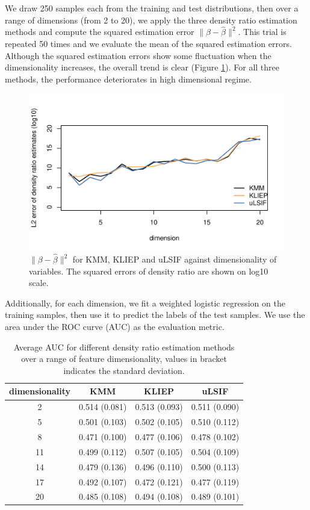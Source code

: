 \documentclass[a4paper,12pt]{article}
\begin{document}
We draw 250 samples each from the training and test distributions, then over a range of dimensions (from 2 to 20), we apply the three density ratio estimation methods and compute the squared estimation error $\|\beta-\hat{\beta}\|^{2}$. This trial is repeated 50 times and we evaluate the mean of the squared estimation errors. Although the squared estimation errors show some fluctuation when the dimensionality increases, the overall trend is clear (Figure \ref{l2_density_ratio.pdf}). For all three methods, the performance deteriorates in high dimensional regime. 
\begin{figure}[h]
    \centering
    \includegraphics{l2_density_ratio.pdf}
    \caption{$\|\beta-\hat{\beta}\|^{2}$ for KMM, KLIEP and uLSIF against dimensionality of variables. The squared errors of density ratio are shown on log10 scale.}
    \label{l2_density_ratio.pdf}
\end{figure}

Additionally, for each dimension, we fit a weighted logistic regression on the training samples, then use it to predict the labels of the test samples. We use the area under the ROC curve (AUC) as the evaluation metric.
\begin{table}[H]
	\centering
\begin{tabular} {c | c | c | c }
dimensionality & KMM & KLIEP & uLSIF  \\
\hline \hline
2 & 0.514 (0.081) & 0.513 (0.093) & 0.511 (0.090)  \\
5 & 0.501 (0.103) & 0.502 (0.105) & 0.510 (0.112) \\
8 & 0.471 (0.100) & 0.477 (0.106) & 0.478 (0.102) \\
11 & 0.499 (0.112) & 0.507 (0.105) & 0.504 (0.109) \\
14 & 0.479 (0.136) & 0.496 (0.110) & 0.500 (0.113) \\
17 & 0.492 (0.107) & 0.472 (0.121) & 0.477 (0.119) \\
20 & 0.485 (0.108) & 0.494 (0.108) & 0.489 (0.101) \\
\hline \hline
\end{tabular}	
\caption{Average AUC for different density ratio estimation methods over a range of feature dimensionality, values in bracket indicates the standard deviation.}
\label{tab_sim}
\end{table}
\end{document}
